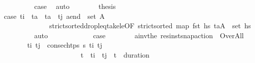 \begin{isabellebody}
\ \ \ \ \ \ \ \ \isamarkupfalse%
\ {\isacartoucheopen}{\isacharquery}{\kern0pt}case{}{\isacartoucheclose}\ \isamarkupfalse%
\ auto\isanewline
\ \ \ \ \ \ \isamarkupfalse%
\ {\isacharquery}{\kern0pt}thesis\isanewline
\ \ \ \ \ \ \ \ \isamarkupfalse%
\ {\isacartoucheopen}{\isacharquery}{\kern0pt}case{}{\isacartoucheclose}\ {\isacartoucheopen}t\isactrlsub i\ {\isacharless}{\kern0pt}\ t\isactrlsub a\ {\isasymand}\ t\isactrlsub a\ {\isacharless}{\kern0pt}\ t\isactrlsub j{\isacartoucheclose}\ {\isacartoucheopen}{\isacharquery}{\kern0pt}a\isactrlsub e\isactrlsub n\isactrlsub d\ {\isasymin}\ set\ A{\isacharprime}{\kern0pt}{\isacartoucheclose}\isanewline
\ \ \ \ \ \ \ \ \ \ \ \ \ \ strict{\isacharunderscore}{\kern0pt}sorted{\isacharunderscore}{\kern0pt}drop{\isacharunderscore}{\kern0pt}leq{\isacharunderscore}{\kern0pt}take{\isacharunderscore}{\kern0pt}le{\isacharbrackleft}{\kern0pt}OF\ {\isacartoucheopen}strict{\isacharunderscore}{\kern0pt}sorted\ {\isacharparenleft}{\kern0pt}map\ fst\ hs\ {\isacartoucheopen}{\isacharparenleft}{\kern0pt}t\isactrlsub a{\isacharcomma}{\kern0pt}A{\isacharprime}{\kern0pt}{\isacharparenright}{\kern0pt}\ {\isasymin}\ set\ hs\isanewline
\ \ \ \ \ \ \ \ \isamarkupfalse%
\ auto\isanewline
\ \ \ \ \isamarkupfalse%
\isanewline
\ \ \ \ \ \ \isamarkupfalse%
\ {\isacharquery}{\kern0pt}case{}\isanewline
\ \ \ \ \ \ \isamarkupfalse%
\ {\isacharquery}{\kern0pt}a\isactrlsub i\isactrlsub n\isactrlsub v{\isacharequal}{\kern0pt}{\isachardoublequoteopen}the\ {\isacharparenleft}{\kern0pt}res{\isacharunderscore}{\kern0pt}inst{\isacharunderscore}{\kern0pt}snap{\isacharunderscore}{\kern0pt}action\ {\isasympi}\ Over{\isacharunderscore}{\kern0pt}All{\isacharparenright}{\kern0pt}{\isachardoublequoteclose}\isanewline
\ \ \ \ \ \ \isamarkupfalse%
\ t\isactrlsub i{\isacharprime}{\kern0pt}\ t\isactrlsub j{\isacharprime}{\kern0pt}\ \ {\isachardoublequoteopen}consec{\isacharunderscore}{\kern0pt}htps\ {\isasympi}s\ t\isactrlsub i{\isacharprime}{\kern0pt}\ t\isactrlsub j{\isacharprime}{\kern0pt}{\isachardoublequoteclose}\ \isanewline
\ \ \ \ \ \ \ \ \ \ \ \ \ \ \ \ \ \ \ \ \ \ \ {\isachardoublequoteopen}t\isactrlsub {\isasympi}\ {\isasymle}\ t\isactrlsub i{\isacharprime}{\kern0pt}\ {\isasymand}\ t\isactrlsub j{\isacharprime}{\kern0pt}\ {\isasymle}\ t\isactrlsub {\isasympi}\ {\isacharplus}{\kern0pt}\ duration\ {\isasympi}{\isachardoublequoteclose}\ \isanewline

\end{isabellebody}

